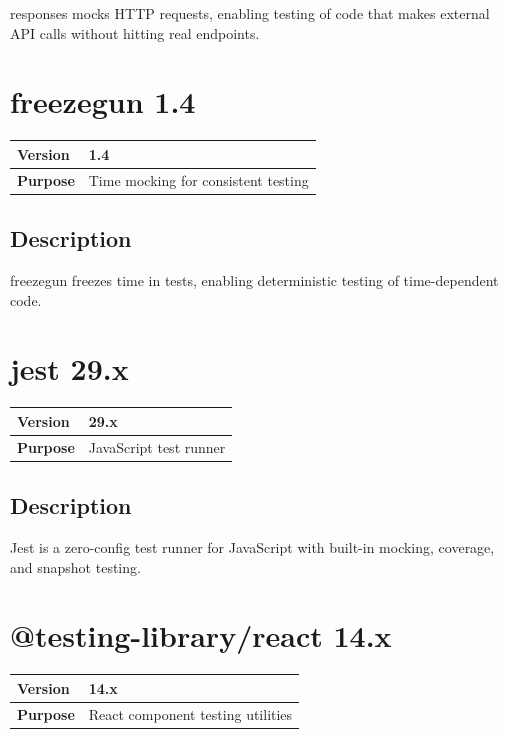 \documentclass[12pt,a4paper]{report}
\begin{document}
responses mocks HTTP requests, enabling testing of code that makes external API calls without hitting real endpoints.

\section{freezegun 1.4}

\begin{tabular}{|p{4cm}|p{10cm}|}
\hline
\textbf{Version} & 1.4 \\
\hline
\textbf{Purpose} & Time mocking for consistent testing \\
\hline
\end{tabular}

\subsection{Description}

freezegun freezes time in tests, enabling deterministic testing of time-dependent code.

\section{jest 29.x}

\begin{tabular}{|p{4cm}|p{10cm}|}
\hline
\textbf{Version} & 29.x \\
\hline
\textbf{Purpose} & JavaScript test runner \\
\hline
\end{tabular}

\subsection{Description}

Jest is a zero-config test runner for JavaScript with built-in mocking, coverage, and snapshot testing.

\section{@testing-library/react 14.x}

\begin{tabular}{|p{4cm}|p{10cm}|}
\hline
\textbf{Version} & 14.x \\
\hline
\textbf{Purpose} & React component testing utilities \\
\hline
\end{tabular}
\end{document}
